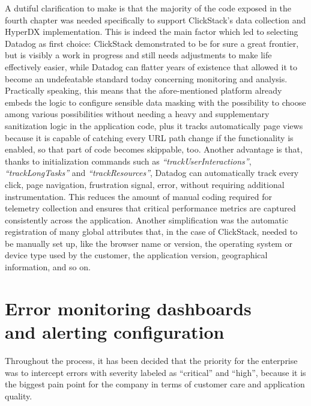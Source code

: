 \documentclass[12pt,a4paper,openright,twoside]{book}
\begin{document}
A dutiful clarification to make is that the majority of the code exposed in the fourth chapter was needed specifically to support ClickStack's data collection and HyperDX implementation. This is indeed the main factor which led to selecting Datadog as first choice: ClickStack demonstrated to be for sure a great frontier, but is visibly a work in progress and still needs adjustments to make life effectively easier, while Datadog can flatter years of existence that allowed it to become an undefeatable standard today concerning monitoring and analysis. Practically speaking, this means that the afore-mentioned platform already embeds the logic to configure sensible data masking with the possibility to choose among various possibilities without needing a heavy and supplementary sanitization logic in the application code, plus it tracks automatically page views because it is capable of catching every URL path change if the functionality is enabled, so that part of code becomes skippable, too. Another advantage is that, thanks to initialization commands such as \textit{``trackUserInteractions''}, \textit{``trackLongTasks''} and \textit{``trackResources''}, Datadog can automatically track every click, page navigation, frustration signal, error, without requiring additional instrumentation. This reduces the amount of manual coding required for telemetry collection and ensures that critical performance metrics are captured consistently across the application. Another simplification was the automatic registration of many global attributes that, in the case of ClickStack, needed to be manually set up, like the browser name or version, the operating system or device type used by the customer, the application version, geographical information, and so on.

\section{Error monitoring dashboards \\ and alerting configuration}

Throughout the process, it has been decided that the priority for the enterprise was to intercept errors with severity labeled as ``critical'' and ``high'', because it is the biggest pain point for the company in terms of customer care and application quality. 
\end{document}
